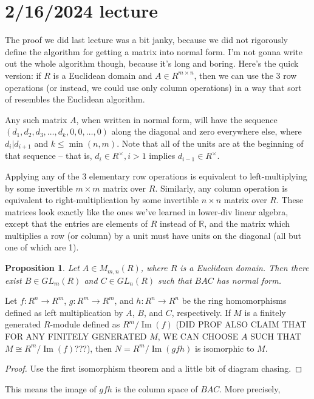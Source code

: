 \documentclass[12pt]{article}
\newtheorem{prop}[thm]{Proposition}
\begin{document}
\section{2/16/2024 lecture}
The proof we did last lecture was a bit janky, because we did not rigorously define the algorithm for getting a matrix into normal form. I'm not gonna write out the whole algorithm though, because it's long and boring. Here's the quick version: if $R$ is a Euclidean domain and $A \in R^{m \times n}$, then we can use the 3 row operations (or instead, we could use only column operations) in a way that sort of resembles the Euclidean algorithm.
\par
Any such matrix $A$, when written in normal form, will have the sequence $(d_1, d_2, d_3, \dots, d_k, 0, 0, \dots, 0)$ along the diagonal and zero everywhere else, where $d_i | d_{i+1}$ and $k \leq \operatorname{min}(n,m)$. Note that all of the units are at the beginning of that sequence -- that is, $d_i \in R^\times, i>1$ implies $d_{i-1} \in R^\times$.
\par
Applying any of the 3 elementary row operations is equivalent to left-multiplying by some invertible $m \times m$ matrix over $R$. Similarly, any column operation is equivalent to right-multiplication by some invertible $n \times n$ matrix over $R$. These matrices look exactly like the ones we've learned in lower-div linear algebra, except that the entries are elements of $R$ instead of $\mathbb{R}$, and the matrix which multiplies a row (or column) by a unit must have units on the diagonal (all but one of which are 1).
\par
\begin{prop}\label{normalform}
    Let $A \in M_{m,n}(R)$, where $R$ is a Euclidean domain. Then there exist $B \in GL_m(R)$ and $C \in GL_n(R)$ such that $BAC$ has normal form.
\end{prop}
\par
Let $f: R^n \rightarrow R^m$, $g: R^m \rightarrow R^m$, and $h: R^n \rightarrow R^n$ be the ring homomorphisms defined as left multiplication by $A$, $B$, and $C$, respectively. If $M$ is a finitely generated $R$-module defined as $R^m/\operatorname{Im}(f)$ (DID PROF ALSO CLAIM THAT FOR ANY FINITELY GENERATED $M$, WE CAN CHOOSE $A$ SUCH THAT $M \cong R^m/\operatorname{Im}(f)$???), then $N=R^m/\operatorname{Im}(gfh)$ is isomorphic to $M$.
\begin{proof}
    Use the first isomorphism theorem and a little bit of diagram chasing.
\end{proof}
This means the image of $gfh$ is the column space of $BAC$. More precisely,
\end{document}
